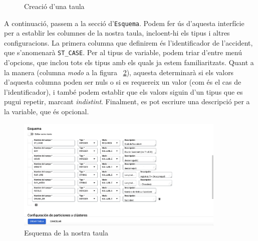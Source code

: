 \documentclass[11pt,longbibliography]{article}
\theoremstyle{definition}
\theoremstyle{remark}
\begin{document}
\begin{figure}[h!]
\par
{}%
\hfill
{}%
\par
\caption{Creació d'una taula}
\label{fig:bq6}
\end{figure}


A continuació, passem a la secció d'\texttt{Esquema}. Podem fer ús d'aquesta interfície per a establir les columnes de la nostra taula, incloent-hi els tipus i altres configuracions. La primera columna que definirem és l'identificador de l'accident, que s'anomenarà \verb|ST_CASE|. Per al tipus de variable, podem triar d'entre menú d'opcions, que inclou tots els tipus amb els quals ja estem familiaritzats. Quant a la manera (columna \textit{modo} a la figura ~\ref{fig:bq8}), aquesta determinarà si els valors d'aquesta columna poden ser nuls o si es requereix un valor (com és el cas de l'identificador), i també podem establir que els valors siguin d'un tipus que es pugui repetir, marcant \textit{indistint}. Finalment, es pot escriure una descripció per a la variable, que és opcional. 


\begin{figure}[h!]
\begin{center}
\includegraphics[width=10cm]{bq8}
\end{center}
\caption{Esquema de la nostra taula}
\label{fig:bq8}
\end{figure}
\end{document}
